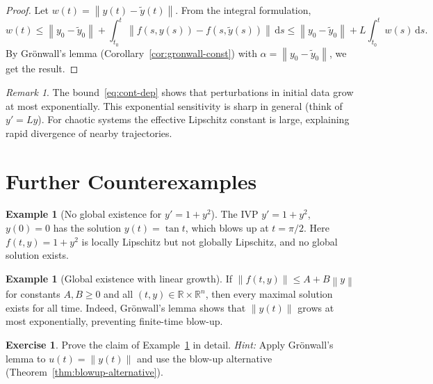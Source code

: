 \documentclass[12pt,a4paper,openany]{book}
\theoremstyle{definition}
\newtheorem{example}[definition]{Example}
\newtheorem{exercise}{Exercise}[chapter]
\theoremstyle{plain}
\theoremstyle{remark}
\newtheorem{remark}[definition]{Remark}
\newcommand{\R}{\mathbb{R}}
\newcommand{\dd}{\mathrm{d}}
\newcommand{\norm}[1]{\left\|#1\right\|}
\begin{document}
\begin{proof}
Let $w(t) = \norm{y(t) - \tilde{y}(t)}$. From the integral formulation,
\[
  w(t) \le \norm{y_0 - \tilde{y}_0}
  + \int_{t_0}^t \norm{f(s,y(s)) - f(s,\tilde{y}(s))}\,\dd s
  \le \norm{y_0 - \tilde{y}_0} + L \int_{t_0}^t w(s)\,\dd s.
\]
By Gr\"onwall's lemma (Corollary~\ref{cor:gronwall-const}) with
$\alpha = \norm{y_0 - \tilde{y}_0}$, we get the result.
\end{proof}

\begin{remark}\label{rem:exponential-sensitivity}
The bound~\eqref{eq:cont-dep} shows that perturbations in initial data grow
at most exponentially. This exponential sensitivity is sharp in general (think
of $y' = Ly$). For chaotic systems the effective Lipschitz constant is large,
explaining rapid divergence of nearby trajectories.
\end{remark}

\section{Further Counterexamples}\label{sec:counterexamples}

\begin{example}[No global existence for $y'=1+y^2$]\label{ex:no-global}
The IVP $y' = 1 + y^2$, $y(0) = 0$ has the solution $y(t) = \tan t$, which
blows up at $t = \pi/2$. Here $f(t,y) = 1+y^2$ is locally Lipschitz but
not globally Lipschitz, and no global solution exists.
\end{example}

\begin{example}[Global existence with linear growth]\label{ex:global-linear}
If $\norm{f(t,y)} \le A + B\norm{y}$ for constants $A, B \ge 0$ and all
$(t,y) \in \R \times \R^n$, then every maximal solution exists for all time.
Indeed, Gr\"onwall's lemma shows that $\norm{y(t)}$ grows at most exponentially,
preventing finite-time blow-up.
\end{example}

\begin{exercise}\label{exer:linear-growth-global}
Prove the claim of Example~\ref{ex:global-linear} in detail.
\emph{Hint:} Apply Gr\"onwall's lemma to $u(t) = \norm{y(t)}$ and use the
blow-up alternative (Theorem~\ref{thm:blowup-alternative}).
\end{exercise}
\end{document}
